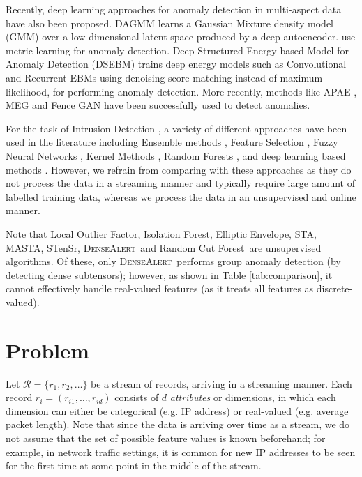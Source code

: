 \documentclass[sigconf]{acmart}
\newcommand{\densealert}{\textsc{DenseAlert}}
\newcommand{\rcf}{Random Cut Forest}
\newcommand{\iso}{Isolation Forest}
\newcommand{\elliptic}{Elliptic Envelope}
\newcommand{\lof}{Local Outlier Factor}
\begin{document}
Recently, deep learning approaches for anomaly detection in multi-aspect data have also been proposed. DAGMM \cite{zong2018deep} learns a Gaussian Mixture density model (GMM) over a low-dimensional latent space produced by a deep autoencoder. \cite{JU2020167} use metric learning for anomaly detection. Deep Structured Energy-based Model for Anomaly Detection (DSEBM) \cite{zhai2016deep} trains deep energy models such as Convolutional and Recurrent EBMs using denoising score matching instead of maximum likelihood, for performing anomaly detection. More recently, methods like APAE \cite{Goodge2020RobustnessOA}, MEG \cite{kumar2019maximum} and Fence GAN \cite{ngo2019} have been successfully used to detect anomalies. 

For the task of Intrusion Detection \cite{Gradison2018, 1565245, 10.1145/3143361.3143399, 10.1016/j.cose.2006.05.005, WANG2014103, 4400777}, a variety of different approaches have been used in the literature including Ensemble methods \cite{DBLP:journals/scn/RajagopalKH20}, Feature Selection \cite{c5d37e2294e349d59233c4b6e41cae3a}, Fuzzy Neural Networks \cite{fuzzynn}, Kernel Methods \cite{10.1007/11427469_77}, Random Forests \cite{8766544}, and deep learning based methods \cite{8681044} \cite{8643036}. However, we refrain from comparing with these approaches as they do not process the data in a streaming manner and typically require large amount of labelled training data, whereas we process the data in an unsupervised and online manner. 

Note that \lof, \iso, \elliptic, STA, MASTA, STenSr, \densealert\ and \rcf\ are unsupervised algorithms. Of these, only \densealert\ performs group anomaly detection (by detecting dense subtensors); however, as shown in Table \ref{tab:comparison}, it cannot effectively handle real-valued features (as it treats all features as discrete-valued).
 \section{Problem}

Let $\mathcal{R} = \{r_1, r_2, \hdots\}$ be a stream of records, arriving in a streaming manner. Each record $r_i = (r_{i1}, \hdots, r_{id})$ consists of $d$ \emph{attributes} or dimensions, in which each dimension can either be categorical (e.g. IP address) or real-valued (e.g. average packet length). Note that since the data is arriving over time as a stream, we do not assume that the set of possible feature values is known beforehand; for example, in network traffic settings, it is common for new IP addresses to be seen for the first time at some point in the middle of the stream.
\end{document}
